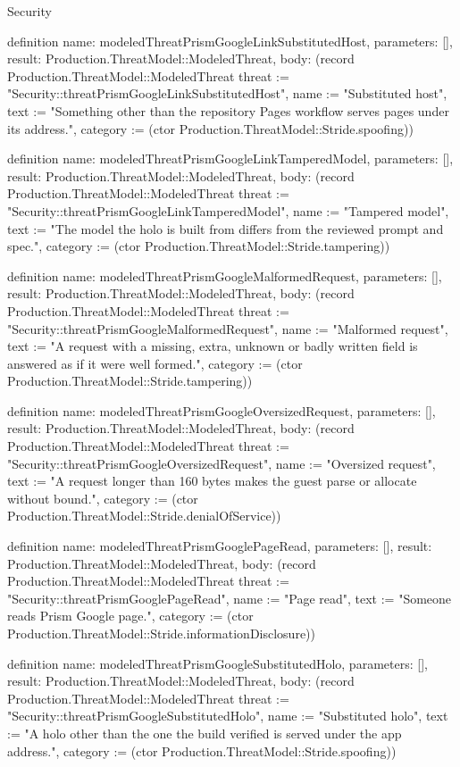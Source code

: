\begin{lexlean}{Security}
\begin{semanticmodule}
definition{
  name: modeledThreatPrismGoogleLinkSubstitutedHost,
  parameters: [],
  result: Production.ThreatModel::ModeledThreat,
  body: (record Production.ThreatModel::ModeledThreat {threat := "Security::threatPrismGoogleLinkSubstitutedHost", name := "Substituted host", text := "Something other than the repository Pages workflow serves pages under its address.", category := (ctor Production.ThreatModel::Stride.spoofing)})
}

definition{
  name: modeledThreatPrismGoogleLinkTamperedModel,
  parameters: [],
  result: Production.ThreatModel::ModeledThreat,
  body: (record Production.ThreatModel::ModeledThreat {threat := "Security::threatPrismGoogleLinkTamperedModel", name := "Tampered model", text := "The model the holo is built from differs from the reviewed prompt and spec.", category := (ctor Production.ThreatModel::Stride.tampering)})
}

definition{
  name: modeledThreatPrismGoogleMalformedRequest,
  parameters: [],
  result: Production.ThreatModel::ModeledThreat,
  body: (record Production.ThreatModel::ModeledThreat {threat := "Security::threatPrismGoogleMalformedRequest", name := "Malformed request", text := "A request with a missing, extra, unknown or badly written field is answered as if it were well formed.", category := (ctor Production.ThreatModel::Stride.tampering)})
}

definition{
  name: modeledThreatPrismGoogleOversizedRequest,
  parameters: [],
  result: Production.ThreatModel::ModeledThreat,
  body: (record Production.ThreatModel::ModeledThreat {threat := "Security::threatPrismGoogleOversizedRequest", name := "Oversized request", text := "A request longer than 160 bytes makes the guest parse or allocate without bound.", category := (ctor Production.ThreatModel::Stride.denialOfService)})
}

definition{
  name: modeledThreatPrismGooglePageRead,
  parameters: [],
  result: Production.ThreatModel::ModeledThreat,
  body: (record Production.ThreatModel::ModeledThreat {threat := "Security::threatPrismGooglePageRead", name := "Page read", text := "Someone reads Prism Google page.", category := (ctor Production.ThreatModel::Stride.informationDisclosure)})
}

definition{
  name: modeledThreatPrismGoogleSubstitutedHolo,
  parameters: [],
  result: Production.ThreatModel::ModeledThreat,
  body: (record Production.ThreatModel::ModeledThreat {threat := "Security::threatPrismGoogleSubstitutedHolo", name := "Substituted holo", text := "A holo other than the one the build verified is served under the app address.", category := (ctor Production.ThreatModel::Stride.spoofing)})
}


\end{semanticmodule}
\end{lexlean}

